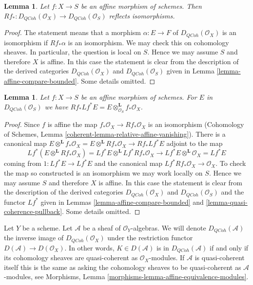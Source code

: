 \documentclass{stacks-project}
\theoremstyle{plain}
\newtheorem{lemma}[subsection]{Lemma}
\theoremstyle{definition}
\theoremstyle{remark}
\numberwithin{equation}{subsection}
\def\QCoh{\mathit{QCoh}}
\begin{document}
\begin{lemma}
\label{lemma-affine-morphism}
Let $f : X \to S$ be an affine morphism of schemes.
Then
$Rf_* : D_\QCoh(\mathcal{O}_X) \to D_\QCoh(\mathcal{O}_S)$
reflects isomorphisms.
\end{lemma}

\begin{proof}
The statement means that a morphism $\alpha : E \to F$ of
$D_\QCoh(\mathcal{O}_X)$ is an isomorphism if
$Rf_*\alpha$ is an isomorphism. We may check this on cohomology sheaves.
In particular, the question is local on $S$. Hence we may assume $S$
and therefore $X$ is affine. In this case the statement is clear from
the description of the derived categories
$D_\QCoh(\mathcal{O}_X)$ and
$D_\QCoh(\mathcal{O}_S)$ given in
Lemma \ref{lemma-affine-compare-bounded}.
Some details omitted.
\end{proof}

\begin{lemma}
\label{lemma-affine-morphism-pull-push}
Let $f : X \to S$ be an affine morphism of schemes.
For $E$ in $D_\QCoh(\mathcal{O}_S)$ we have
$Rf_* Lf^* E = E \otimes^\mathbf{L}_{\mathcal{O}_S} f_*\mathcal{O}_X$.
\end{lemma}

\begin{proof}
Since $f$ is affine the map $f_*\mathcal{O}_X \to Rf_*\mathcal{O}_X$
is an isomorphism
(Cohomology of Schemes, Lemma \ref{coherent-lemma-relative-affine-vanishing}).
There is a canonical map $E \otimes^\mathbf{L} f_*\mathcal{O}_X =
E \otimes^\mathbf{L} Rf_*\mathcal{O}_X \to Rf_* Lf^* E$
adjoint to the map
$$
Lf^*(E \otimes^\mathbf{L} Rf_*\mathcal{O}_X) =
Lf^*E \otimes^\mathbf{L} Lf^*Rf_*\mathcal{O}_X \longrightarrow
Lf^* E \otimes^\mathbf{L} \mathcal{O}_X = Lf^* E
$$
coming from $1 : Lf^*E \to Lf^*E$ and the canonical map
$Lf^*Rf_*\mathcal{O}_X \to \mathcal{O}_X$. To check the map so constructed
is an isomorphism we may work locally on $S$. Hence we may assume
$S$ and therefore $X$ is affine. In this case the statement is clear from
the description of the derived categories
$D_\QCoh(\mathcal{O}_X)$ and
$D_\QCoh(\mathcal{O}_S)$ and the functor $Lf^*$ given in
Lemmas \ref{lemma-affine-compare-bounded} and
\ref{lemma-quasi-coherence-pullback}.
Some details omitted.
\end{proof}

\noindent
Let $Y$ be a scheme. Let $\mathcal{A}$ be a sheaf of $\mathcal{O}_Y$-algebras.
We will denote $D_\QCoh(\mathcal{A})$ the inverse image of
$D_\QCoh(\mathcal{O}_X)$ under the restriction functor
$D(\mathcal{A}) \to D(\mathcal{O}_X)$. In other words, $K \in D(\mathcal{A})$
is in $D_\QCoh(\mathcal{A})$ if and only if its cohomology sheaves are
quasi-coherent as $\mathcal{O}_X$-modules. If $\mathcal{A}$ is quasi-coherent
itself this is the same as asking the cohomology sheaves to be quasi-coherent
as $\mathcal{A}$-modules, see
Morphisms, Lemma \ref{morphisms-lemma-affine-equivalence-modules}.
\end{document}
